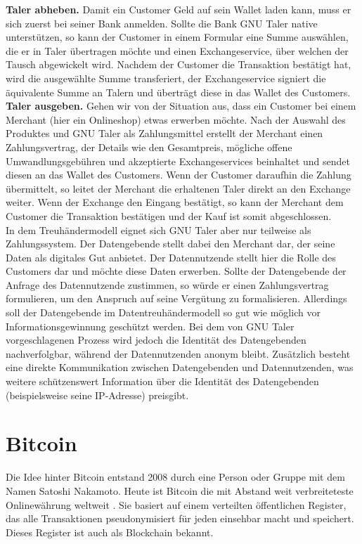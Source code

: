 \documentclass{scrreprt}
\begin{document}
\textbf{Taler abheben.} Damit ein Customer Geld auf sein Wallet laden kann, muss er sich zuerst bei seiner Bank anmelden. Sollte die Bank GNU Taler native unterstützen, so kann der Customer in einem Formular eine Summe auswählen, die er in Taler übertragen möchte und einen Exchangeservice, über welchen der Tausch abgewickelt wird. Nachdem der Customer die Transaktion bestätigt hat, wird die ausgewählte Summe transferiert, der Exchangeservice signiert die äquivalente Summe an Talern und überträgt diese in das Wallet des Customers.\\

\textbf{Taler ausgeben.} Gehen wir von der Situation aus, dass ein Customer bei einem Merchant (hier ein Onlineshop) etwas erwerben möchte. Nach der Auswahl des Produktes und GNU Taler als Zahlungsmittel erstellt der Merchant einen Zahlungsvertrag, der Details wie den Gesamtpreis, mögliche offene Umwandlungsgebühren und akzeptierte Exchangeservices beinhaltet und sendet diesen an das Wallet des Customers.  Wenn der Customer daraufhin die Zahlung übermittelt, so leitet der Merchant die erhaltenen Taler direkt an den Exchange weiter. Wenn der Exchange den Eingang bestätigt, so kann der Merchant dem Customer die Transaktion bestätigen und der Kauf ist somit abgeschlossen.\\


In dem Treuhändermodell eignet sich GNU Taler aber nur teilweise als Zahlungssystem. Der Datengebende stellt dabei den Merchant dar, der seine Daten als digitales Gut anbietet. Der Datennutzende stellt hier die Rolle des Customers dar und möchte diese Daten erwerben. Sollte der Datengebende der Anfrage des Datennutzende zustimmen, so würde er einen Zahlungsvertrag formulieren, um den Anspruch auf seine Vergütung zu formalisieren. Allerdings soll der Datengebende im Datentreuhändermodell so gut wie möglich vor Informationsgewinnung geschützt werden. Bei dem von GNU Taler vorgeschlagenen Prozess wird jedoch die Identität des Datengebenden nachverfolgbar, während der Datennutzenden anonym bleibt. Zusätzlich besteht eine direkte Kommunikation zwischen Datengebenden und Datennutzenden, was weitere schützenswert Information über die Identität des Datengebenden (beispielsweise seine IP-Adresse) preisgibt.

\section{Bitcoin}
\label{sec:bitcoin}
Die Idee hinter Bitcoin entstand 2008 durch eine Person oder Gruppe mit dem Namen Satoshi Nakamoto. Heute ist Bitcoin die mit Abstand weit verbreiteteste Onlinewährung weltweit \cite{btc-beginnerGuide}. Sie basiert auf einem verteilten öffentlichen Register, das alle Transaktionen pseudonymisiert für jeden einsehbar macht und speichert. Dieses Register ist auch als Blockchain bekannt.
\end{document}
